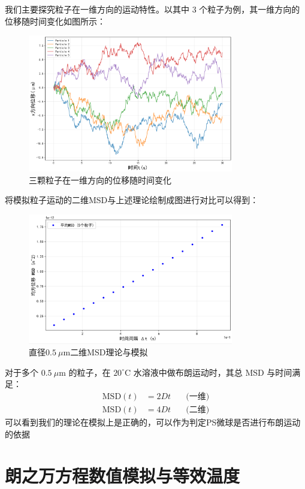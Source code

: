 \documentclass[a4paper]{report} %
\begin{document}
我们主要探究粒子在一维方向的运动特性。以其中 3 个粒子为例，其一维方向的位移随时间变化如图所示：
\begin{figure}[H]
  \centering
  \includegraphics[width=0.8\textwidth]{displacement.png}
  \caption{三颗粒子在一维方向的位移随时间变化}
  \label{fig:displacement}
\end{figure}
将模拟粒子运动的二维MSD与上述理论绘制成图进行对比可以得到：
\begin{figure}[H]
  \centering
  \includegraphics[width=0.8\textwidth]{二维MSD.png}
  \caption{直径$0.5~\mu\text{m}$二维MSD理论与模拟}
\end{figure}
对于多个 $0.5~\mu\text{m}$ 的粒子，在 $20^\circ$C 水溶液中做布朗运动时，其总 MSD 与时间满足\cite{einstein1905}：
\begin{align}
  \text{MSD}(t) &= 2Dt \quad &\text{(一维)} \\
  \text{MSD}(t) &= 4Dt \quad &\text{(二维)}
\end{align}
可以看到我们的理论在模拟上是正确的，可以作为判定PS微球是否进行布朗运动的依据

\section{朗之万方程数值模拟与等效温度}
\end{document}
